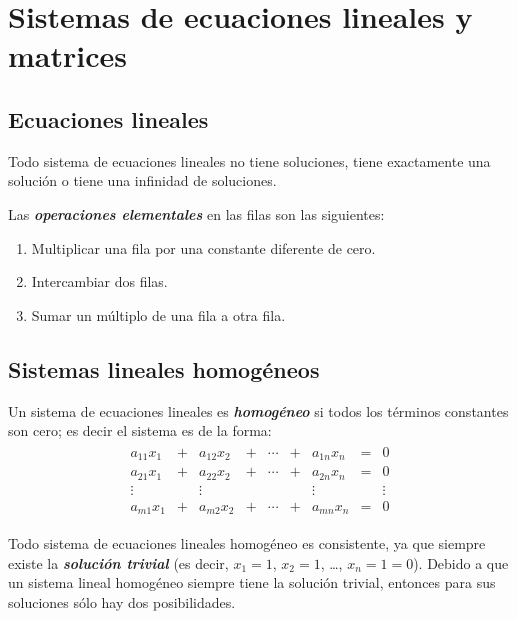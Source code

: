 \documentclass[a4paper,12pt]{article}
\begin{document}
\section{Sistemas de ecuaciones lineales y matrices}

\subsection{Ecuaciones lineales}

\begin{concept}[i]
  Todo sistema de ecuaciones lineales no tiene soluciones, tiene exactamente
  una solución o tiene una infinidad de soluciones.
\end{concept}

Las \textbf{\emph{operaciones elementales}} en las filas son las siguientes:

\begin{concept}
  \begin{enumerate}
    \item Multiplicar una fila por una constante diferente de cero.
    \item Intercambiar dos filas.
    \item Sumar un múltiplo de una fila a otra fila.
  \end{enumerate}
\end{concept}

\subsection{Sistemas lineales homogéneos}
Un sistema de ecuaciones lineales es \textbf{\emph{homogéneo}} si todos los
términos constantes son cero; es decir el sistema es de la forma:
\begin{align*}
  \begin{matrix}
    a_{11}x_1 &+& a_{12}x_2 &+& \cdots &+& a_{1n}x_n &=& 0     \\
    a_{21}x_1 &+& a_{22}x_2 &+& \cdots &+& a_{2n}x_n &=& 0     \\
    \vdots    & &\vdots     & &        & &\vdots     & & \vdots\\
    a_{m1}x_1 &+& a_{m2}x_2 &+& \cdots &+& a_{mn}x_n &=& 0
  \end{matrix}
\end{align*}

Todo sistema de ecuaciones lineales homogéneo es consistente, ya que siempre
existe la \textbf{\textit{solución trivial}} (es decir, $x_1=1$, $x_2=1$,
\ldots, $x_n=1=0$).
Debido a que un sistema lineal homogéneo siempre tiene la solución trivial,
entonces para sus soluciones sólo hay dos posibilidades.
\end{document}
